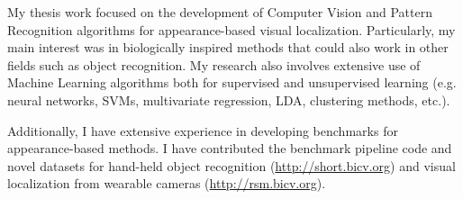 My thesis work focused on the development of Computer Vision and Pattern Recognition algorithms for appearance-based visual localization. Particularly, my main interest was in biologically inspired methods that could also work in other fields such as object recognition. My research also involves extensive use of Machine Learning algorithms both for supervised and unsupervised learning (e.g. neural networks, SVMs, multivariate regression, LDA, clustering methods, etc.).

Additionally, I have extensive experience in developing benchmarks for appearance-based methods. I have contributed the benchmark pipeline code and novel datasets for hand-held object recognition (\url{http://short.bicv.org}) and visual localization from wearable cameras (\url{http://rsm.bicv.org}).

